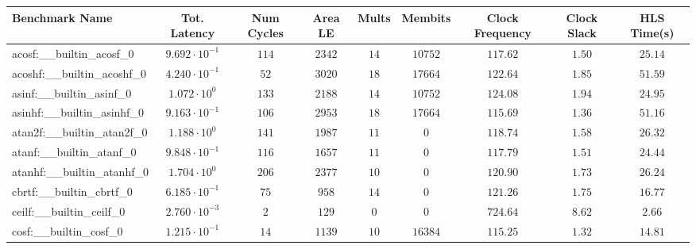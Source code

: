 \begin{tabular}{|l|c|c|c|c|c|c|c|c|}
\hline
Benchmark Name                            & Tot. Latency            & Num Cycles & Area LE   & Mults   & Membits    & Clock Frequency & Clock Slack & HLS Time(s) \\
\hline
acosf:\_\_builtin\_acosf\_0               & $ 9.692 \cdot 10^{-1} $ & $ 114    $ & $ 2342  $ & $ 14  $ & $ 10752  $ & $ 117.62      $ & $ 1.50    $ & $ 25.14   $ \\
acoshf:\_\_builtin\_acoshf\_0             & $ 4.240 \cdot 10^{-1} $ & $ 52     $ & $ 3020  $ & $ 18  $ & $ 17664  $ & $ 122.64      $ & $ 1.85    $ & $ 51.59   $ \\
asinf:\_\_builtin\_asinf\_0               & $ 1.072 \cdot 10^{0}  $ & $ 133    $ & $ 2188  $ & $ 14  $ & $ 10752  $ & $ 124.08      $ & $ 1.94    $ & $ 24.95   $ \\
asinhf:\_\_builtin\_asinhf\_0             & $ 9.163 \cdot 10^{-1} $ & $ 106    $ & $ 2953  $ & $ 18  $ & $ 17664  $ & $ 115.69      $ & $ 1.36    $ & $ 51.16   $ \\
atan2f:\_\_builtin\_atan2f\_0             & $ 1.188 \cdot 10^{0}  $ & $ 141    $ & $ 1987  $ & $ 11  $ & $ 0      $ & $ 118.74      $ & $ 1.58    $ & $ 26.32   $ \\
atanf:\_\_builtin\_atanf\_0               & $ 9.848 \cdot 10^{-1} $ & $ 116    $ & $ 1657  $ & $ 11  $ & $ 0      $ & $ 117.79      $ & $ 1.51    $ & $ 24.44   $ \\
atanhf:\_\_builtin\_atanhf\_0             & $ 1.704 \cdot 10^{0}  $ & $ 206    $ & $ 2377  $ & $ 10  $ & $ 0      $ & $ 120.90      $ & $ 1.73    $ & $ 26.24   $ \\
cbrtf:\_\_builtin\_cbrtf\_0               & $ 6.185 \cdot 10^{-1} $ & $ 75     $ & $ 958   $ & $ 14  $ & $ 0      $ & $ 121.26      $ & $ 1.75    $ & $ 16.77   $ \\
ceilf:\_\_builtin\_ceilf\_0               & $ 2.760 \cdot 10^{-3} $ & $ 2      $ & $ 129   $ & $ 0   $ & $ 0      $ & $ 724.64      $ & $ 8.62    $ & $ 2.66    $ \\
cosf:\_\_builtin\_cosf\_0                 & $ 1.215 \cdot 10^{-1} $ & $ 14     $ & $ 1139  $ & $ 10  $ & $ 16384  $ & $ 115.25      $ & $ 1.32    $ & $ 14.81   $ \\

\end{tabular}
